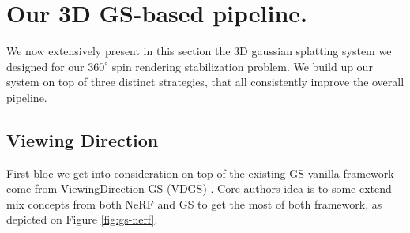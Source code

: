 \section{Our 3D GS-based pipeline.}
We now extensively present in this section the 3D gaussian splatting system we designed for our $360^{\circ}$ spin rendering stabilization problem. We build up our system on top of three distinct strategies, that all consistently improve the overall pipeline. 

\subsection{Viewing Direction}
First bloc we get into consideration on top of the existing GS vanilla framework come from ViewingDirection-GS (VDGS) \cite{malarzgaussian}. Core authors idea is to some extend mix concepts from both NeRF and GS to get the most of both framework, as depicted on Figure \ref{fig:gs-nerf}. 

